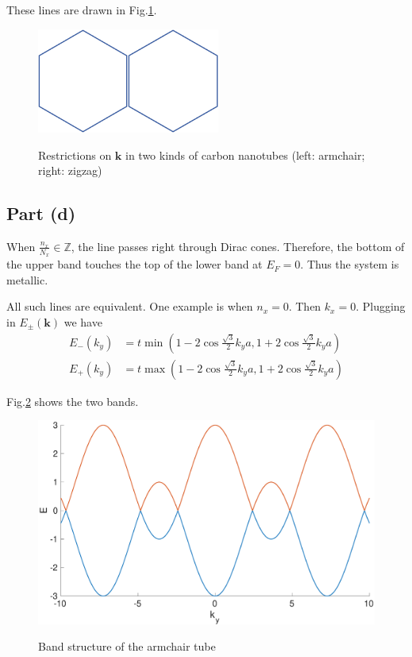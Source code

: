 \documentclass{article}
\begin{document}
These lines are drawn in Fig.\ref{lines}.
\begin{figure}[!htbp]
	\centering
	\includegraphics[width=3cm]{hex.png}\quad\quad\quad\quad\quad\quad\quad\quad\quad\quad\quad\quad\includegraphics[width=3cm]{hex.png}\\
	\caption{Restrictions on $\mathbf{k}$ in two kinds of carbon nanotubes (left: armchair; right: zigzag)}\label{lines}
\end{figure}

\subsection{Part (d)}
When $\frac{n_x}{N_x}\in\mathbb{Z}$, the line passes right through Dirac cones. Therefore, the bottom of the upper band touches the top of the lower band at $E_F=0$. Thus the system is metallic.

All such lines are equivalent. One example is when $n_x=0$. Then $k_x=0$. Plugging in $E_\pm(\mathbf{k})$ we have
\begin{align*}
E_-(k_y)&=t\min\left(1-2\cos\frac{\sqrt{3}}{2}k_ya,1+2\cos\frac{\sqrt{3}}{2}k_ya\right)\\
E_+(k_y)&=t\max\left(1-2\cos\frac{\sqrt{3}}{2}k_ya,1+2\cos\frac{\sqrt{3}}{2}k_ya\right)
\end{align*}

Fig.\ref{armchair} shows the two bands.
\begin{figure}[!htbp]
	\centering
	\includegraphics[width=12cm]{armchair.eps}\\
	\caption{Band structure of the armchair tube}\label{armchair}
\end{figure}
\end{document}

